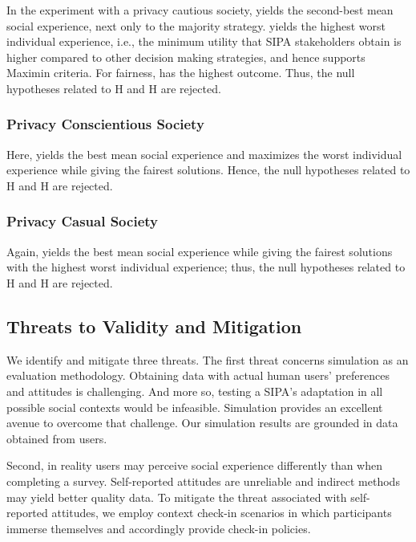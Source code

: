 In the experiment with a privacy cautious society, \frameworkAinur yields the second-best mean social experience, next only to the majority strategy. \frameworkAinur yields the highest worst individual experience, i.e., the minimum utility that SIPA stakeholders obtain is higher compared to other decision making strategies, and hence supports Maximin criteria. For fairness, \frameworkAinur has the highest outcome. Thus, the null hypotheses related to H and H are rejected. 

\subsubsection{Privacy Conscientious Society}

Here, \frameworkAinur yields the best mean social experience and maximizes the worst individual experience while giving the fairest solutions. Hence, the null hypotheses related to H and H are rejected.

\subsubsection{Privacy Casual Society}

Again, \frameworkAinur yields the best mean social experience while giving the fairest solutions with the highest worst individual experience; thus, the null hypotheses related to H and H are rejected. 

\subsection{Threats to Validity and Mitigation}

We identify and mitigate three threats. 
%
The first threat concerns simulation as an evaluation methodology. Obtaining data with actual human users' preferences and attitudes is challenging. And more so, testing a SIPA's adaptation
in all possible social contexts would be infeasible. Simulation provides an excellent avenue to overcome that challenge. Our simulation results are grounded in data obtained from users. 

Second, in reality users may perceive social experience differently than when completing a survey. Self-reported attitudes are unreliable and indirect methods may yield better quality data. To mitigate the threat associated with self-reported attitudes, we employ context check-in scenarios in which participants immerse themselves and accordingly provide check-in policies.

